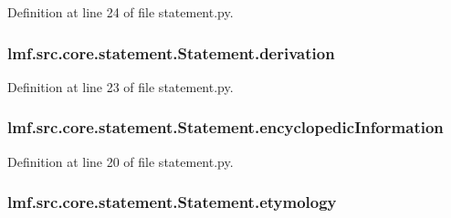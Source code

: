 Definition at line 24 of file statement.\+py.

\hypertarget{classlmf_1_1src_1_1core_1_1statement_1_1_statement_afa73464513552afc8a6bf3828446a7d9}{
\subsubsection[{derivation}]{\setlength{\rightskip}{0pt plus 5cm}lmf.\+src.\+core.\+statement.\+Statement.\+derivation}}\label{classlmf_1_1src_1_1core_1_1statement_1_1_statement_afa73464513552afc8a6bf3828446a7d9}


Definition at line 23 of file statement.\+py.

\hypertarget{classlmf_1_1src_1_1core_1_1statement_1_1_statement_a3f6a8d066930ce775d6f6655ea5f3dfa}{
\subsubsection[{encyclopedic\+Information}]{\setlength{\rightskip}{0pt plus 5cm}lmf.\+src.\+core.\+statement.\+Statement.\+encyclopedic\+Information}}\label{classlmf_1_1src_1_1core_1_1statement_1_1_statement_a3f6a8d066930ce775d6f6655ea5f3dfa}


Definition at line 20 of file statement.\+py.

\hypertarget{classlmf_1_1src_1_1core_1_1statement_1_1_statement_a1232c0098a52fa5f72d6a80c8661152a}{
\subsubsection[{etymology}]{\setlength{\rightskip}{0pt plus 5cm}lmf.\+src.\+core.\+statement.\+Statement.\+etymology}}\label{classlmf_1_1src_1_1core_1_1statement_1_1_statement_a1232c0098a52fa5f72d6a80c8661152a}


